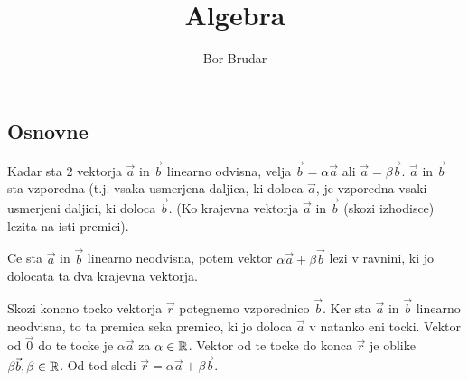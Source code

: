 \documentclass{report}
\title{\Huge{Algebra}}
\author{Bor Brudar}
\date{}
\begin{document}
\maketitle
\newpage%
\tableofcontents
\pagebreak


\chapter{}
\section{Osnovne}



Kadar sta 2 vektorja $\vec{a}$ in $\vec{b}$ linearno odvisna, velja $\vec{b} = \alpha \vec{a}$ ali $\vec{a} = \beta \vec{b}$. $\vec{a}$ in $\vec{b}$ sta vzporedna (t.j. vsaka usmerjena daljica, ki doloca $\vec{a}$, je vzporedna vsaki usmerjeni daljici, ki doloca $\vec{b}$. (Ko krajevna vektorja $\vec{a}$ in $\vec{b}$ (skozi izhodisce) lezita na isti premici).


Ce sta $\vec{a}$ in $\vec{b}$ linearno neodvisna, potem vektor $\alpha \vec{a} + \beta \vec{b}$ lezi v ravnini, ki jo dolocata ta dva krajevna vektorja.


\sol Skozi koncno tocko vektorja $\vec{r}$ potegnemo vzporednico $\vec{b}$. Ker sta $\vec{a}$ in $\vec{b}$ linearno neodvisna, to ta premica seka premico, ki jo doloca $\vec{a}$ v natanko eni tocki. Vektor od $\vec{0}$ do te tocke je $\alpha \vec{a}$ za $\alpha \in \mathbb{R}$. Vektor od te tocke do konca $\vec{r}$ je oblike $ \beta \vec{b} ,\beta \in \mathbb{R}$. Od tod sledi $\vec{r} = \alpha \vec{a} + \beta \vec{b}$.
\end{document}
